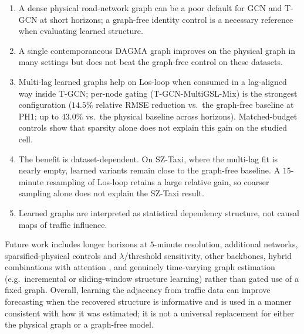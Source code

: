 \begin{enumerate}
\item A dense physical road-network graph can be a poor default for GCN and
T-GCN at short horizons; a graph-free identity control is a necessary
reference when evaluating learned structure.
\item A single contemporaneous DAGMA graph improves on the physical graph in
many settings but does not beat the graph-free control on these datasets.
\item Multi-lag learned graphs help on Los-loop when consumed in a
lag-aligned way inside T-GCN; per-node gating (T-GCN-MultiGSL-Mix) is the
strongest configuration ($14.5\%$ relative RMSE reduction vs.\ the
graph-free baseline at PH1; up to $43.0\%$ vs.\ the physical baseline
across horizons). Matched-budget controls show that sparsity alone does not
explain this gain on the studied cell.
\item The benefit is dataset-dependent. On SZ-Taxi, where the multi-lag fit
is nearly empty, learned variants remain close to the graph-free baseline.
A $15$-minute resampling of Los-loop retains a large relative gain, so
coarser sampling alone does not explain the SZ-Taxi result.
\item Learned graphs are interpreted as statistical dependency structure,
not causal maps of traffic influence.
\end{enumerate}

Future work includes longer horizons at $5$-minute resolution, additional
networks, sparsified-physical controls and $\lambda$/threshold sensitivity,
other backbones, hybrid combinations with attention
\citep{Sun2023Attention}, and genuinely time-varying graph estimation
(e.g.\ incremental or sliding-window structure learning) rather than gated
use of a fixed graph. Overall, learning the adjacency from traffic data can
improve forecasting when the recovered structure is informative and is used
in a manner consistent with how it was estimated; it is not a universal
replacement for either the physical graph or a graph-free model.
